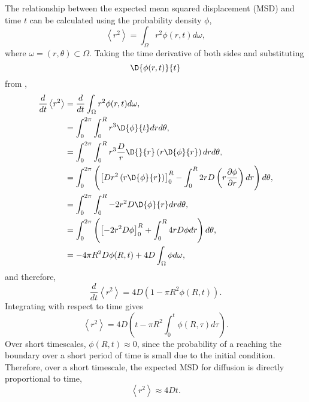 The relationship between the expected mean squared displacement (MSD) and time $t$
can be calculated using the probability density $\phi$,
%
\begin{equation}
\left<r^2\right> = \int_{\Omega}r^2 \phi(r,t) d\omega ,
\label{eqn:MSD_expectation}
\end{equation}
%
where $\omega = (r,\theta) \subset \Omega$. Taking the time derivative of both
sides and substituting
\begin{equation}
    \D{\phi(r,t)}{t}
\end{equation} from ,
%
\begin{align}
\frac{d}{dt} \left<r^2\right> &= \frac{d}{dt}\int_{\Omega}r^2 \phi(r,t) d\omega ,\\
                           &= \int_0^{2\pi} \int_0^{R} r^3 \D{\phi}{t} dr d\theta ,\\
                            &= \int_0^{2\pi} \int_0^{R} r^3 \frac{D}{r} \D{}{r } \left( r \D{ \phi}{ r}\right) dr d\theta , \\
                            &= \int_0^{2\pi} \left( \left[ D r^2 \left( r \D{ \phi}{ r}\right) \right]_0^{R} - \int_0^{R} 2rD \left(r \frac{\partial \phi}{\partial r} \right) dr \right) d\theta , \\
                            &= \int_0^{2\pi} \int_0^{R} -2r^2D \D{ \phi}{r}dr d\theta , \\
                            &= \int_0^{2\pi} \left( \left[-2r^2D \phi \right]_0^{R} + \int_0^{R} 4rD \phi dr \right)d\theta , \\
                            &= - 4\pi R^2D \phi(R,t) + 4D \int_{\Omega} \phi d\omega ,
\label{eqn:diffusion_1}
\end{align}
%
and therefore,
\begin{equation}
\frac{d}{dt} \left<r^2\right>  = 4D( 1- \pi R^2 \phi(R,t)) .
\end{equation}
%
Integrating with respect to time gives
%
\begin{equation}
\left<r^2\right> = 4D \left( t - \pi R^2 \int_0^t \phi(R,\tau) d \tau \right).
\label{eqn:diffusion_msd}
\end{equation}
%
Over short timescales, $\phi(R,t) \approx 0$, since the probability of a reaching the boundary over a short period of time is small due to the initial condition. Therefore, over a short timescale, the expected MSD for diffusion is directly proportional to time,
%
\begin{equation}
\left<r^2\right> \approx 4Dt.
\label{eqn:diffusion_short}
\end{equation}
